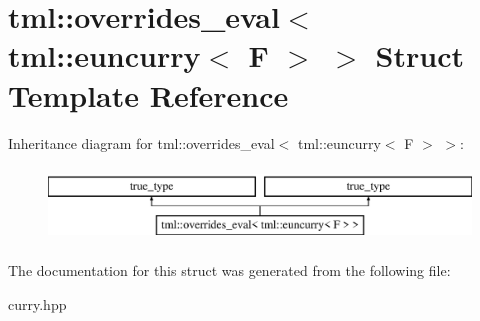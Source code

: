 \hypertarget{structtml_1_1overrides__eval_3_01tml_1_1euncurry_3_01F_01_4_01_4}{\section{tml\+:\+:overrides\+\_\+eval$<$ tml\+:\+:euncurry$<$ F $>$ $>$ Struct Template Reference}
\label{structtml_1_1overrides__eval_3_01tml_1_1euncurry_3_01F_01_4_01_4}
}
Inheritance diagram for tml\+:\+:overrides\+\_\+eval$<$ tml\+:\+:euncurry$<$ F $>$ $>$\+:\begin{figure}[H]
\begin{center}
\leavevmode
\includegraphics[height=2.000000cm]{structtml_1_1overrides__eval_3_01tml_1_1euncurry_3_01F_01_4_01_4}
\end{center}
\end{figure}


The documentation for this struct was generated from the following file\+:\begin{DoxyCompactItemize}
\item 
curry.\+hpp\end{DoxyCompactItemize}
